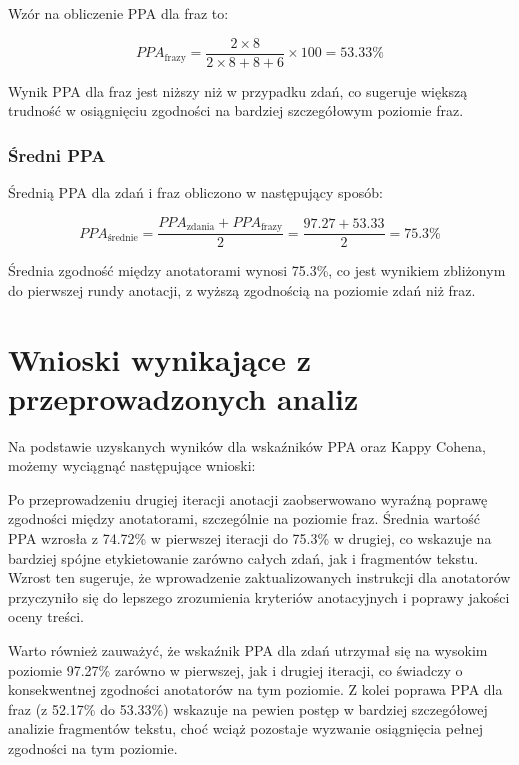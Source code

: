 \documentclass[12pt]{article}
\begin{document}
Wzór na obliczenie PPA dla fraz to:

\begin{dmath}
PPA_{\text{frazy}} = \frac{2 \times 8}{2 \times 8 + 8 + 6} \times 100 = 53.33\%
\end{dmath}

Wynik PPA dla fraz jest niższy niż w przypadku zdań, co sugeruje większą trudność w osiągnięciu zgodności na bardziej szczegółowym poziomie fraz.

\subsubsection{Średni PPA}

Średnią PPA dla zdań i fraz obliczono w następujący sposób:

\begin{dmath}
PPA_{\text{średnie}} = \frac{PPA_{\text{zdania}} + PPA_{\text{frazy}}}{2} = \frac{97.27 + 53.33}{2} = 75.3\%
\end{dmath}

Średnia zgodność między anotatorami wynosi 75.3\%, co jest wynikiem zbliżonym do pierwszej rundy anotacji, z wyższą zgodnością na poziomie zdań niż fraz.

\section{Wnioski wynikające z przeprowadzonych analiz}

Na podstawie uzyskanych wyników dla wskaźników PPA oraz Kappy Cohena, możemy wyciągnąć następujące wnioski:

Po przeprowadzeniu drugiej iteracji anotacji zaobserwowano wyraźną poprawę zgodności między anotatorami, szczególnie na poziomie fraz. Średnia wartość PPA wzrosła z 74.72\% w pierwszej iteracji do 75.3\% w drugiej, co wskazuje na bardziej spójne etykietowanie zarówno całych zdań, jak i fragmentów tekstu. Wzrost ten sugeruje, że wprowadzenie zaktualizowanych instrukcji dla anotatorów przyczyniło się do lepszego zrozumienia kryteriów anotacyjnych i poprawy jakości oceny treści.

Warto również zauważyć, że wskaźnik PPA dla zdań utrzymał się na wysokim poziomie 97.27\% zarówno w pierwszej, jak i drugiej iteracji, co świadczy o konsekwentnej zgodności anotatorów na tym poziomie. Z kolei poprawa PPA dla fraz (z 52.17\% do 53.33\%) wskazuje na pewien postęp w bardziej szczegółowej analizie fragmentów tekstu, choć wciąż pozostaje wyzwanie osiągnięcia pełnej zgodności na tym poziomie.
\end{document}
